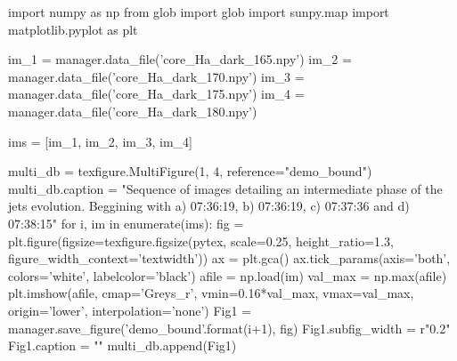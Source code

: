 \documentclass{emulateapj}
\begin{document}
\begin{pycode}
import numpy as np
from glob import glob
import sunpy.map
import matplotlib.pyplot as plt

im_1 = manager.data_file('core_Ha_dark_165.npy')
im_2 = manager.data_file('core_Ha_dark_170.npy')
im_3 = manager.data_file('core_Ha_dark_175.npy')
im_4 = manager.data_file('core_Ha_dark_180.npy')

ims = [im_1, im_2, im_3, im_4]

multi_db = texfigure.MultiFigure(1, 4, reference="demo_bound")
multi_db.caption = "Sequence of images detailing an intermediate phase of the jets evolution. Beggining with a) 07:36:19, b) 07:36:19, c) 07:37:36 and d) 07:38:15"
for i, im in enumerate(ims):
	fig = plt.figure(figsize=texfigure.figsize(pytex, scale=0.25, height_ratio=1.3, figure_width_context='textwidth'))
	ax = plt.gca()
	ax.tick_params(axis='both', colors='white', labelcolor='black')
	afile = np.load(im)
	val_max = np.max(afile)
	plt.imshow(afile, cmap='Greys_r', vmin=0.16*val_max, vmax=val_max, origin='lower', interpolation='none')
	Fig1 = manager.save_figure('demo_bound{}'.format(i+1), fig)
	Fig1.subfig_width = r"0.2\textwidth"
	Fig1.caption = ""
	multi_db.append(Fig1)

\end{pycode}
\end{document}
